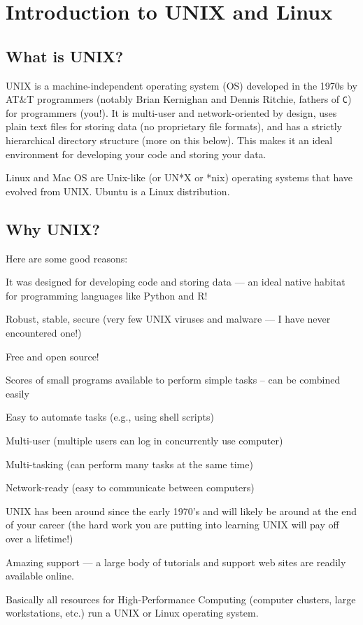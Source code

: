 \chapter{Introduction to UNIX and Linux}
\label{chap:unix1}


\section{What is UNIX?}

UNIX is a machine-independent operating system (OS) developed in the 
1970s by AT\&T programmers (notably Brian Kernighan and Dennis Ritchie, 
fathers of {\tt C}) for programmers (you!). It is multi-user and 
network-oriented by design, uses plain text files for storing data (no 
proprietary file formats), and has a strictly hierarchical directory 
structure (more on this below). This makes it an ideal environment for 
developing your code and storing your data.

Linux and Mac OS are Unix-like (or UN*X or *nix) operating systems that 
have evolved from UNIX. Ubuntu is a Linux distribution.

\section{Why UNIX?}
Here are some good reasons:
 \begin{compactitem}
  \item It was designed for developing code and storing data --- 
  an ideal native habitat for programming languages like Python and R! 
  \item Robust, stable, secure (very few UNIX viruses and malware --- I have never encountered one!) 
  \item Free and open source!
  \item Scores of small programs available to perform simple tasks -- can be 
combined easily
  \item Easy to automate tasks (e.g., using shell scripts)
  \item Multi-user (multiple users can log in concurrently use computer)
  \item Multi-tasking (can perform many tasks at the same time)
  \item Network-ready (easy to communicate between computers)
  \item UNIX has been around since the early 1970's and will likely be 
  around at the end of your career (the hard work you are putting into 
  learning UNIX will pay off over a lifetime!)
  \item Amazing support --- a large body of tutorials and support web 
  sites are readily available online. 
	\item Basically all resources for High-Performance Computing (computer clusters, large workstations, etc.) run a
UNIX or Linux operating system. 
  \end{compactitem}

